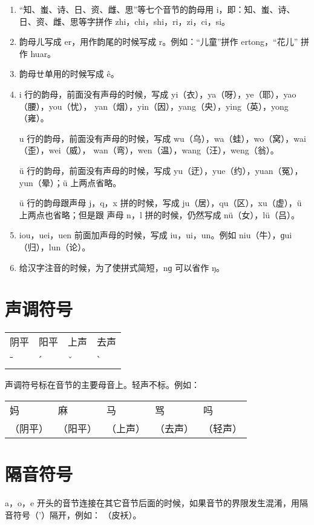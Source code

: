 \documentclass[zihao=-4,fontset=none]{ctexart}
\begin{document}
\begin{enumerate}
  \item “知、蚩、诗、日、资、雌、思”等七个音节的韵母用 i，即：知、蚩、诗、日、资、雌、思等字拼作
        zhi，chi，shi，ri，zi，ci，si。

  \item 韵母ㄦ写成 er，用作韵尾的时候写成 r。例如：“儿童”拼作 ertong，“花儿” 拼作 huar。

  \item 韵母ㄝ单用的时候写成 ê。

  \item i 行的韵母，前面没有声母的时候，写成 yi（衣），ya（呀），ye（耶），yao（腰），you（忧），
        yan（烟），yin（因），yang（央），ying（英），yong（雍）。

    u 行的韵母，前面没有声母的时候，写成 wu（乌），wa（蛙），wo（窝），wai（歪），wei（威），
        wan（弯），wen（温），wang（汪），weng（翁）。

    ü 行的韵母，前面没有声母的时候，写成 yu（迂），yue（约），yuan（冤），yun（晕）；ü 上两点省略。

    ü 行的韵母跟声母 j，q，x 拼的时候，写成 ju（居），qu（区），xu（虚），ü 上两点也省略；但是跟
        声母 n，l 拼的时候，仍然写成 nü（女），lü（吕）。

  \item iou，uei，uen 前面加声母的时候，写成 iu，ui，un。例如 niu（牛），ɡui（归），lun（论）。

  \item 给汉字注音的时候，为了使拼式简短，nɡ 可以省作 ŋ。
\end{enumerate}

\section{声调符号}

\begin{center}
  \begin{tabular}{*{4}{C{3em}}}
    阴平 & 阳平 & 上声 & 去声 \\
    ˉ    & ˊ    & ˇ    & ˋ
  \end{tabular}
\end{center}

声调符号标在音节的主要母音上。轻声不标。例如：

\begin{center}
  \begin{tabular}{*{5}{C{4em}}}
    妈  & 麻  & 马  & 骂  & 吗  \\
    （阴平）        & （阳平）        & （上声）        & （去声）        & （轻声）
  \end{tabular}
\end{center}

\section{隔音符号}

a，o，e 开头的音节连接在其它音节后面的时候，如果音节的界限发生混淆，用隔音符号（'）隔开，例如：
（皮袄）。
\end{document}
